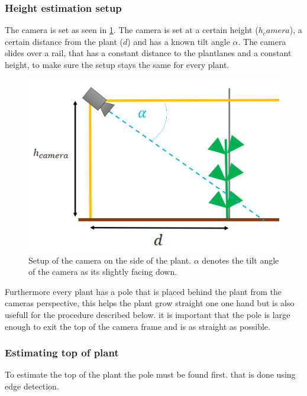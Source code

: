 \subsubsection{Height estimation setup}
The camera  is set as seen in \ref{fig:setupSide}. The camera is set at a certain height ($h_camera$), a certain distance from the plant ($d$) and has a known tilt angle $\alpha$. The camera slides over a rail, that has a constant distance to the plantlanes and a constant height, to make sure the setup stays the same for every plant.
   \begin{figure}[H]
       \centering
       \includegraphics[scale=0.6]{setupSide.PNG}
       \caption{Setup of the camera on the side of the plant. $\alpha$ denotes the tilt angle of the camera as its slightly facing down. }
       \label{fig:setupSide}
   \end{figure}
Furthermore every plant has a pole that is placed behind the plant from the cameras perspective, this helps the plant grow straight one one hand but is also usefull for the procedure described below. it is important that the pole is large enough to exit the top of the camera frame and is as straight as possible.
\subsubsection{Estimating top of plant}
To estimate the top of the plant the pole must be found first. that is done using edge detection.
